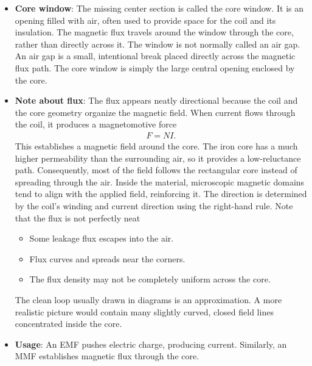 \documentclass{report}
\begin{document}
\begin{itemize}
            The cross sectional area $A$ is the area of the core cut perpendicular to the magnetic flux.
            \bigbreak \noindent 
            The path length $l$ is the total closed distance the magnetic flux travels around the core. It is usually approximated along the centerline of the core material, halfway between the inner and outer edges.
        \item \textbf{Core window}: The missing center section is called the core window. It is an opening filled with air, often used to provide space for the coil and its insulation. The magnetic flux travels around the window through the core, rather than directly across it.
            \bigbreak \noindent 
            The window is not normally called an air gap. An air gap is a small, intentional break placed directly across the magnetic flux path. The core window is simply the large central opening enclosed by the core.
        \item \textbf{Note about flux}: The flux appears neatly directional because the coil and the core geometry organize the magnetic field. When current flows through the coil, it produces a magnetomotive force
            \begin{align*}
                F = NI
            .\end{align*}
            This establishes a magnetic field around the core. The iron core has a much higher permeability than the surrounding air, so it provides a low-reluctance path. Consequently, most of the field follows the rectangular core instead of spreading through the air.
            \bigbreak \noindent 
            Inside the material, microscopic magnetic domains tend to align with the applied field, reinforcing it. The direction is determined by the coil’s winding and current direction using the right-hand rule.
            \bigbreak \noindent 
            Note that the flux is not perfectly neat
            \begin{itemize}
                \item Some leakage flux escapes into the air.
                \item Flux curves and spreads near the corners.
                \item The flux density may not be completely uniform across the core.
            \end{itemize}
            The clean loop usually drawn in diagrams is an approximation. A more realistic picture would contain many slightly curved, closed field lines concentrated inside the core.
        \item \textbf{Usage}: An EMF pushes electric charge, producing current. Similarly, an MMF establishes magnetic flux through the core.

\end{itemize}
\end{document}
